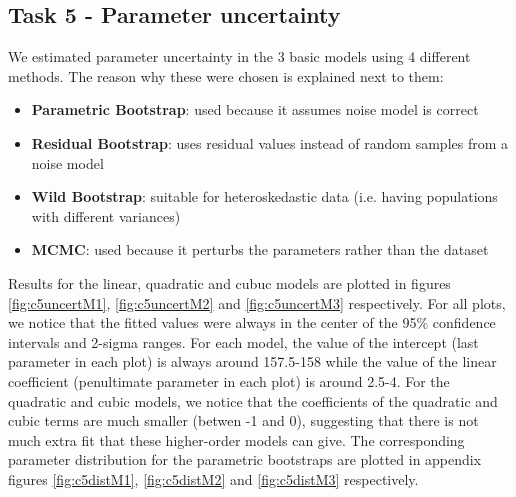 \documentclass[11pt,a4paper,oneside]{report}
\begin{document}
\subsection*{Task 5 - Parameter uncertainty}

We estimated parameter uncertainty in the 3 basic models using 4 different methods. The reason why these were chosen is explained next to them:
\begin{itemize}
 \item \textbf{Parametric Bootstrap}: used because it assumes noise model is correct
 \item \textbf{Residual Bootstrap}: uses residual values instead of random samples from a noise model
 \item \textbf{Wild Bootstrap}: suitable for heteroskedastic data (i.e. having populations with different variances)
 \item \textbf{MCMC}: used because it perturbs the parameters rather than the dataset 
 \end{itemize}

Results for the linear, quadratic and cubuc models are plotted in figures \ref{fig:c5uncertM1}, \ref{fig:c5uncertM2} and \ref{fig:c5uncertM3} respectively. For all plots, we notice that the fitted values were always in the center of the 95\% confidence intervals and 2-sigma ranges. For each model, the value of the intercept (last parameter in each plot) is always around 157.5-158 while the value of the linear coefficient (penultimate parameter in each plot) is around 2.5-4. For the quadratic and cubic models, we notice that the coefficients of the quadratic and cubic terms are much smaller (betwen -1 and 0), suggesting that there is not much extra fit that these higher-order models can give. The corresponding parameter distribution for the parametric bootstraps are plotted in appendix figures \ref{fig:c5distM1}, \ref{fig:c5distM2} and \ref{fig:c5distM3} respectively.
\end{document}
